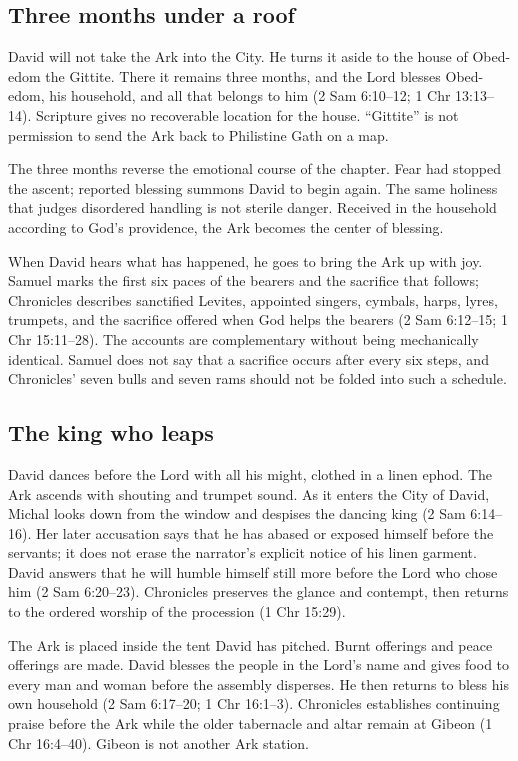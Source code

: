 \subsection{Three months under a roof}

David will not take the Ark into the City.  He turns it aside to the house of
Obed-edom the Gittite.  There it remains three months, and the Lord blesses
Obed-edom, his household, and all that belongs to him
(2 Sam 6:10--12; 1 Chr 13:13--14).  Scripture gives no recoverable location
for the house.  ``Gittite'' is not permission to send the Ark back to
Philistine Gath on a map.

The three months reverse the emotional course of the chapter.  Fear had
stopped the ascent; reported blessing summons David to begin again.  The same
holiness that judges disordered handling is not sterile danger.  Received in
the household according to God's providence, the Ark becomes the center of
blessing.

When David hears what has happened, he goes to bring the Ark up with joy.
Samuel marks the first six paces of the bearers and the sacrifice that follows;
Chronicles describes sanctified Levites, appointed singers, cymbals, harps,
lyres, trumpets, and the sacrifice offered when God helps the bearers
(2 Sam 6:12--15; 1 Chr 15:11--28).  The accounts are complementary without
being mechanically identical.  Samuel does not say that a sacrifice occurs
after every six steps, and Chronicles' seven bulls and seven rams should not
be folded into such a schedule.

\subsection{The king who leaps}

David dances before the Lord with all his might, clothed in a linen ephod.  The
Ark ascends with shouting and trumpet sound.  As it enters the City of David,
Michal looks down from the window and despises the dancing king
(2 Sam 6:14--16).  Her later accusation says that he has abased or exposed
himself before the servants; it does not erase the narrator's explicit notice
of his linen garment.  David answers that he will humble himself still more
before the Lord who chose him (2 Sam 6:20--23).  Chronicles preserves the
glance and contempt, then returns to the ordered worship of the procession
(1 Chr 15:29).

The Ark is placed inside the tent David has pitched.  Burnt offerings and
peace offerings are made.  David blesses the people in the Lord's name and
gives food to every man and woman before the assembly disperses.  He then
returns to bless his own household (2 Sam 6:17--20; 1 Chr 16:1--3).
Chronicles establishes continuing praise before the Ark while the older
tabernacle and altar remain at Gibeon (1 Chr 16:4--40).  Gibeon is not another
Ark station.

